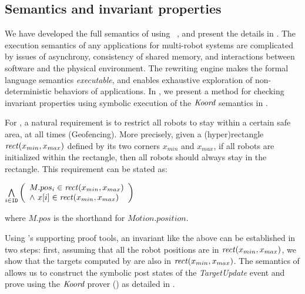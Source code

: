 \subsection{Semantics and invariant properties}

We have developed the full semantics of \lgname using \K~\cite{rosu-serbanuta-2013-k}, and present the details in .
The execution semantics of any applications for multi-robot systems are complicated by issues of asynchrony,
consistency of shared memory, and interactions between software and the physical environment.
The \K rewriting engine makes the formal language semantics \emph{executable},
and enables exhaustive exploration of non-deterministic behaviors of \lgname applications.
In , we present a method for checking invariant properties using symbolic execution of the $\emph{Koord}$ semantics in \K.

For \LineForm, a natural requirement is to restrict all robots to stay within a certain safe area, at all times (Geofencing).
More precisely, given a (hyper)rectangle $\mathit{rect}(x_{min}, x_{max})$ defined by its two corners $x_{min}$ and $x_{max}$,
if all robots are initialized within the rectangle, then all robots should always stay in the rectangle.
This requirement can be stated as:
\begin{invariant}
\label{inv:lineform}
\(
\bigwedge\limits_{i \in \texttt{ID}}
    \left(
    \begin{array}{l}
        M.pos_{i} \in \mathit{rect}(x_{min}, x_{max}) \\
        \land\ x[i] \in \mathit{rect}(x_{min}, x_{max})
    \end{array}
    \right)
\)
\end{invariant}
\noindent
where $M.pos$ is the shorthand for $Motion.position$.

Using \lgname's supporting proof tools, an invariant like the above can be established in two steps:
first, assuming that all the robot positions are in $\mathit{rect}(x_{min}, x_{max})$,
we show that the targets computed by \LineForm are also in $\mathit{rect}(x_{min}, x_{max})$.
The \K semantics of \lgname allows us to construct the symbolic post states of the \emph{TargetUpdate} event
and prove  using the $\emph{Koord}$ prover () as detailed in .

